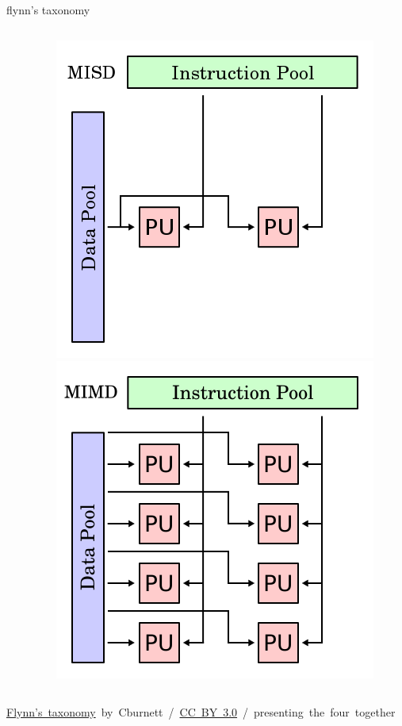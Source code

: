 \documentclass[10pt, t]{beamer}
\begin{document}
\begin{frame}{flynn's taxonomy}
\begin{columns}
\begin{column}{.27\textwidth}
      \end{column}
      \begin{column}{.27\textwidth}
        \centering
        \includegraphics[width=\textwidth]{MISD.png}\\
        \includegraphics[width=\textwidth]{MIMD.png}
      \end{column}
    \end{columns}
    \hfill \tiny{\href{https://en.wikipedia.org/wiki/Flynn's\_taxonomy}{Flynn's~taxonomy}~by~Cburnett~/~\href{http://creativecommons.org/licenses/by-sa/3.0}{CC~BY~3.0}~/~presenting~the~four~together}


\end{frame}
\end{document}
